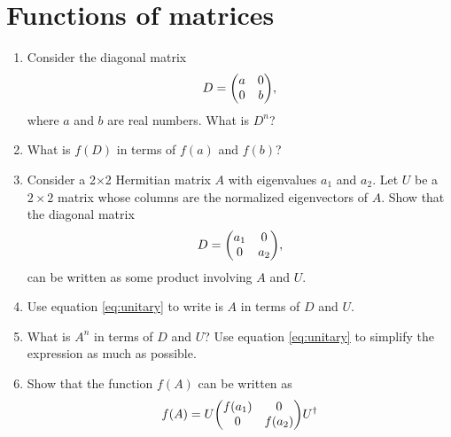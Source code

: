 \documentclass{article}
\begin{document}
\section{Functions of matrices}
  \begin{enumerate}[label=(\alph*)]
      \item\label{it:D} Consider the diagonal matrix
      \begin{equation}
      D = \mqty(a&0\\0&b),
      \end{equation}
      where $a$ and $b$ are real numbers.  What is $D^n$?
      \vspace{1.5cm}
      \item What is $f(D)$ in terms of $f(a)$ and $f(b)$?
      \vspace{2cm}
      \item Consider a 2$\times$2 Hermitian matrix $A$ with eigenvalues $a_1$ and $a_2$. Let $U$ be a $2\times2$ matrix whose columns are the normalized eigenvectors of $A$.  Show that the diagonal matrix
      \begin{equation}
      D = \mqty(a_1&0\\0&a_2),
      \end{equation}
      can be written as some product involving $A$ and $U$.
      \vspace{2cm}
      \item Use equation \ref{eq:unitary} to write is $A$ in terms of $D$ and $U$.
      \vspace{2cm}
      \item What is $A^n$ in terms of $D$ and $U$? Use equation \ref{eq:unitary} to simplify the expression as much as possible.
      \vspace{2cm}
      \item\label{it:f(A)} Show that the function $f(A)$ can be written as
      \begin{equation}
      f(A)
      = U
      \mqty(f(a_1) &0\\0 &f(a_2))
      U^\dagger
      \end{equation}
      \vspace{2.5cm}
    \end{enumerate}
\newpage
\end{document}
